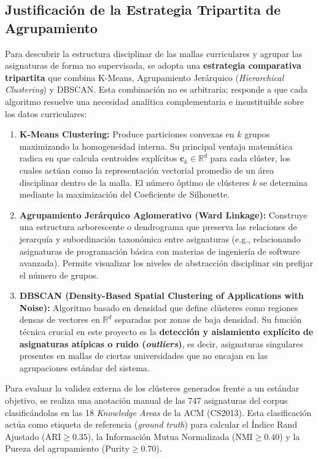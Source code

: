 \subsection{Justificación de la Estrategia Tripartita de Agrupamiento}
\label{sec:clustering_justification}

Para descubrir la estructura disciplinar de las mallas curriculares y agrupar las asignaturas de forma no supervisada, se adopta una \textbf{estrategia comparativa tripartita} que combina K-Means, Agrupamiento Jerárquico (\textit{Hierarchical Clustering}) y DBSCAN. Esta combinación no es arbitraria; responde a que cada algoritmo resuelve una necesidad analítica complementaria e insustituible sobre los datos curriculares:
\begin{enumerate}[label=\arabic*.]
	\item \textbf{K-Means Clustering:} Produce particiones convexas en $k$ grupos maximizando la homogeneidad interna. Su principal ventaja matemática radica en que calcula centroides explícitos $\mathbf{c}_k \in \mathbb{R}^d$ para cada clúster, los cuales actúan como la representación vectorial promedio de un área disciplinar dentro de la malla. El número óptimo de clústeres $k$ se determina mediante la maximización del Coeficiente de Silhouette.
	\item \textbf{Agrupamiento Jerárquico Aglomerativo (Ward Linkage):} Construye una estructura arborescente o dendrograma que preserva las relaciones de jerarquía y subordinación taxonómica entre asignaturas (e.g., relacionando asignaturas de programación básica con materias de ingeniería de software avanzada). Permite visualizar los niveles de abstracción disciplinar sin prefijar el número de grupos.
	\item \textbf{DBSCAN (Density-Based Spatial Clustering of Applications with Noise):} Algoritmo basado en densidad que define clústeres como regiones densas de vectores en $\mathbb{R}^d$ separadas por zonas de baja densidad. Su función técnica crucial en este proyecto es la \textbf{detección y aislamiento explícito de asignaturas atípicas o ruido (\textit{outliers})}, es decir, asignaturas singulares presentes en mallas de ciertas universidades que no encajan en las agrupaciones estándar del sistema.
\end{enumerate}

Para evaluar la validez externa de los clústeres generados frente a un estándar objetivo, se realiza una anotación manual de las 747 asignaturas del corpus clasificándolas en las 18 \textit{Knowledge Areas} de la ACM (CS2013). Esta clasificación actúa como etiqueta de referencia (\textit{ground truth}) para calcular el Índice Rand Ajustado ($\text{ARI} \ge 0.35$), la Información Mutua Normalizada ($\text{NMI} \ge 0.40$) y la Pureza del agrupamiento ($\text{Purity} \ge 0.70$).
